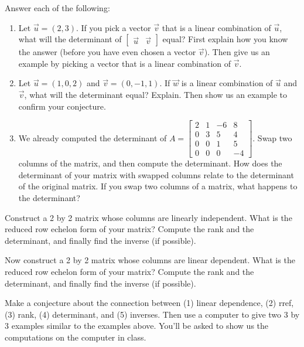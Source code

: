 \begin{problem}
Answer each of the following:
\begin{enumerate}
 \item Let $\vec u = (2,3)$.  If you pick a vector $\vec v$ that is a linear combination of $\vec u$, what will the determinant of $\begin{bmatrix}\vec u &\vec v\end{bmatrix}$ equal? First explain how you know the answer (before you have even chosen a vector $\vec v$).  Then give us an example by picking a vector that is a linear combination of $\vec v$.
 \item Let $\vec u = (1,0,2)$ and $\vec v=(0,-1,1)$.  If $\vec w$ is a linear combination of $\vec u$ and $\vec v$, what will the determinant equal?  Explain.  Then show us an example to confirm your conjecture.
 \item  
We already computed the determinant of $A=
\begin{bmatrix}
 2 & 1 & -6 & 8 \\
 0 & 3 & 5 & 4 \\
 0 & 0 & 1 & 5 \\
 0 & 0 & 0 & -4
\end{bmatrix}$. Swap two columns of the matrix, and then compute the determinant.  How does the determinant of your matrix with swapped columns relate to the determinant of the original matrix. If you swap two columns of a matrix, what happens to the determinant?   
\end{enumerate}
 
\end{problem}



\begin{problem}
 Construct a 2 by 2 matrix whose columns are linearly independent.  What is the reduced row echelon form of your matrix? Compute the rank and the determinant, and finally find the inverse (if possible).  

 Now construct a 2 by 2 matrix whose columns are linear dependent.  What is the reduced row echelon form of your matrix? Compute the rank and the determinant, and finally find the inverse (if possible).  

 Make a conjecture about the connection between (1) linear dependence, (2) rref, (3) rank, (4) determinant, and (5) inverses. Then use a computer to give two 3 by 3 examples similar to the examples above.  You'll be asked to show us the computations on the computer in class.
\end{problem}


